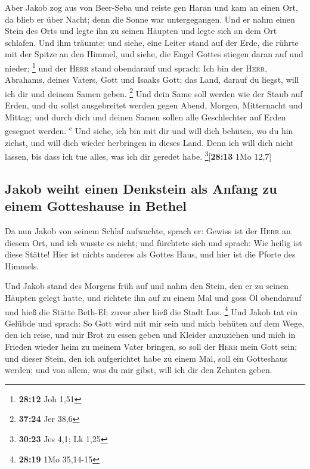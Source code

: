  Aber Jakob zog aus von Beer-Seba und reiste gen Haran
 und kam an einen Ort, da blieb er über Nacht; denn die
Sonne war untergegangen. Und er nahm einen Stein des Orts und legte ihn
zu seinen Häupten und legte sich an dem Ort schlafen. 
Und ihm träumte; und siehe, eine Leiter stand auf der Erde, die rührte
mit der Spitze an den Himmel, und siehe, die Engel Gottes stiegen daran
auf und nieder; \footnote{\textbf{28:12} Joh 1,51}  und
der \textsc{Herr} stand obendarauf und sprach: Ich bin der
\textsc{Herr}, Abrahams, deines Vaters, Gott und Isaaks Gott; das Land,
darauf du liegst, will ich dir und deinem Samen geben. \footnote{\textbf{37:24}
  Jer 38,6}  Und dein Same soll werden wie der Staub auf
Erden, und du sollst ausgebreitet werden gegen Abend, Morgen,
Mitternacht und Mittag; und durch dich und deinen Samen sollen alle
Geschlechter auf Erden gesegnet werden. \textsuperscript{c}
 Und siehe, ich bin mit dir und will dich behüten, wo du
hin ziehst, und will dich wieder herbringen in dieses Land. Denn ich
will dich nicht lassen, bis dass ich tue alles, was ich dir geredet
habe. \footnote{\textbf{30:23} Jes 4,1; Lk 1,25}{[}\textbf{28:13} 1Mo
12,7{]}

\hypertarget{jakob-weiht-einen-denkstein-als-anfang-zu-einem-gotteshause-in-bethel}{%
\subsection{Jakob weiht einen Denkstein als Anfang zu einem Gotteshause
in
Bethel}\label{jakob-weiht-einen-denkstein-als-anfang-zu-einem-gotteshause-in-bethel}}

 Da nun Jakob von seinem Schlaf aufwachte, sprach er:
Gewiss ist der \textsc{Herr} an diesem Ort, und ich wusste es nicht;
 und fürchtete sich und sprach: Wie heilig ist diese
Stätte! Hier ist nichts anderes als Gottes Haus, und hier ist die Pforte
des Himmels.

 Und Jakob stand des Morgens früh auf und nahm den Stein,
den er zu seinen Häupten gelegt hatte, und richtete ihn auf zu einem Mal
und goss Öl obendarauf  und hieß die Stätte Beth-El;
zuvor aber hieß die Stadt Lus. \footnote{\textbf{28:19} 1Mo 35,14-15}
 Und Jakob tat ein Gelübde und sprach: So Gott wird mit
mir sein und mich behüten auf dem Wege, den ich reise, und mir Brot zu
essen geben und Kleider anzuziehen  und mich in Frieden
wieder heim zu meinem Vater bringen, so soll der \textsc{Herr} mein Gott
sein;  und dieser Stein, den ich aufgerichtet habe zu
einem Mal, soll ein Gotteshaus werden; und von allem, was du mir gibst,
will ich dir den Zehnten geben.

